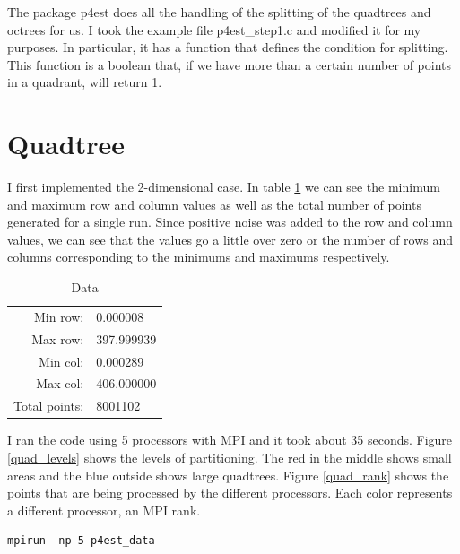 \documentclass[12pt,letterpaper]{article}
\begin{document}
The package p4est does all the handling of the splitting of the quadtrees and octrees for us. I took the example file p4est\_step1.c and modified it for my purposes. In particular, it has a function that defines the condition for splitting. This function is a boolean that, if we have more than a certain number of points in a quadrant, will return 1.

\section{Quadtree}

I first implemented the 2-dimensional case. In table \ref{data} we can see the minimum and maximum row and column values as well as the total number of points generated for a single run. Since positive noise was added to the row and column values, we can see that the values go a little over zero or the number of rows and columns corresponding to the minimums and maximums respectively.

\begin{table}
\centering
\caption{Data}
\label{data}
\begin{tabular}{rl}
Min row:& 0.000008\\
Max row:& 397.999939\\
Min col:& 0.000289\\
Max col:& 406.000000\\
Total points: & 8001102
\end{tabular}
\end{table}

I ran the code using 5 processors with MPI and it took about 35 seconds. Figure \ref{quad_levels} shows the levels of partitioning. The red in the middle shows small areas and the blue outside shows large quadtrees. Figure \ref{quad_rank} shows the points that are being processed by the different processors. Each color represents a different processor, an MPI rank.

\begin{verbatim}
mpirun -np 5 p4est_data
\end{verbatim}
\end{document}
